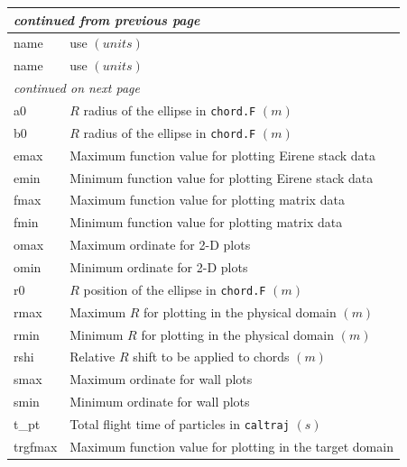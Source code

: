 \documentclass[a4paper,10pt]{report}
\begin{document}
\begin{center}
  \begin{longtable}{|l|l|}
    \hline
    \multicolumn{2}{|l|}{\small\sl continued from previous page} \\
    \hline name & use $(units)$ \\
    \hline \endhead
    \hline name & use $(units)$ \\
    \hline \endfirsthead
    \hline
    \multicolumn{2}{|l|}{\small\sl continued on next page} \\
    \hline \endfoot
    \endlastfoot
    a0 \index{b2plot, a0}      & $R$ radius of the ellipse in {\tt chord.F} $(m)$ \\
    b0 \index{b2plot, b0}      & $R$ radius of the ellipse in {\tt chord.F} $(m)$ \\
    emax \index{b2plot, emax}    & Maximum function value for plotting Eirene stack data \\
    emin \index{b2plot, emin}    & Minimum function value for plotting Eirene stack data \\
    fmax \index{b2plot, fmax}    & Maximum function value for plotting matrix data \\
    fmin \index{b2plot, fmin}    & Minimum function value for plotting matrix data \\
    omax \index{b2plot, omax}    & Maximum ordinate for 2-D plots \\
    omin \index{b2plot, omin}    & Minimum ordinate for 2-D plots \\
    r0 \index{b2plot, r0}      & $R$ position of the ellipse in {\tt chord.F} $(m)$ \\
    rmax \index{b2plot, rmax}    & Maximum $R$ for plotting in the physical domain $(m)$ \\
    rmin \index{b2plot, rmin}    & Minimum $R$ for plotting in the physical domain $(m)$ \\
    rshi \index{b2plot, rshi}    & Relative $R$ shift to be applied to chords $(m)$ \\
    smax \index{b2plot, smax}    & Maximum ordinate for wall plots \\
    smin \index{b2plot, smin}    & Minimum ordinate for wall plots \\
    t\_pt \index{b2plot, t\_pt}   & Total flight time of particles in {\tt caltraj} $(s)$ \\
    trgfmax \index{b2plot, trgfmax} & Maximum function value for plotting in the target domain \\

\end{longtable}
\end{center}
\end{document}
